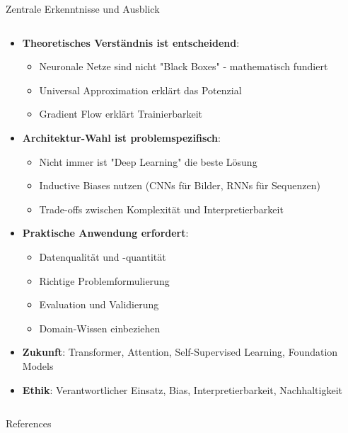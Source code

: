 \documentclass[aspectratio=1610, xcolor=dvipsnames, 9pt]{beamer}
\begin{document}
\begin{frame}{Zentrale Erkenntnisse und Ausblick}
  \begin{columns}
    \begin{column}{1\textwidth}
      \begin{itemize}
        \item \textbf{Theoretisches Verständnis ist entscheidend}:
        \begin{itemize}
          \item Neuronale Netze sind nicht "Black Boxes" - mathematisch fundiert
          \item Universal Approximation erklärt das Potenzial
          \item Gradient Flow erklärt Trainierbarkeit
        \end{itemize}
        \item \textbf{Architektur-Wahl ist problemspezifisch}:
        \begin{itemize}
          \item Nicht immer ist "Deep Learning" die beste Lösung
          \item Inductive Biases nutzen (CNNs für Bilder, RNNs für Sequenzen)
          \item Trade-offs zwischen Komplexität und Interpretierbarkeit
        \end{itemize}
        \item \textbf{Praktische Anwendung erfordert}:
        \begin{itemize}
          \item Datenqualität und -quantität
          \item Richtige Problemformulierung
          \item Evaluation und Validierung
          \item Domain-Wissen einbeziehen
        \end{itemize}
        \item \textbf{Zukunft}: Transformer, Attention, Self-Supervised Learning, Foundation Models
        \item \textbf{Ethik}: Verantwortlicher Einsatz, Bias, Interpretierbarkeit, Nachhaltigkeit
      \end{itemize}
    \end{column}
  \end{columns}
\end{frame}



\begin{frame}[allowframebreaks]{References}
 
 
\end{frame}
\end{document}
